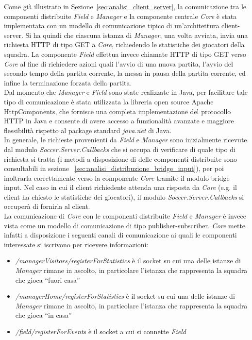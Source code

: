 Come già illustrato in Sezione~\ref{sec:analisi_client_server}, la comunicazione tra le componenti distribuite \emph{Field} e \emph{Manager} e la componente centrale \emph{Core} è stata implementata con un modello di comunicazione tipico di un’architettura client-server. Si ha quindi che ciascuna istanza di \emph{Manager}, una volta avviata, invia una richiesta HTTP di tipo GET a \emph{Core}, richiedendo le statistiche dei giocatori della squadra. La componente \emph{Field} effettua invece chiamate HTTP di tipo GET verso \emph{Core} al fine di richiedere azioni quali l'avvio di una nuova partita, l'avvio del secondo tempo della partita corrente, la messa in pausa della partita corrente, ed infine la terminazione forzata della partita.\\

Dal momento che \textit{Manager} e \textit{Field} sono state realizzate in Java, per facilitare tale tipo di comunicazione è stata utilizzata la libreria open source Apache HttpComponents, che fornisce una completa implementazione del protocollo HTTP in Java e consente di avere accesso a funzionalità avanzate e maggiore flessibilità rispetto al package standard \emph{java.net} di Java.\\

In generale, le richieste provenienti da \emph{Field} e \emph{Manager} sono inizialmente ricevute dal modulo \emph{Soccer.Server.Callbacks} che si occupa di verificare di quale tipo di richiesta si tratta (i metodi a disposizione di delle componenti distribuite sono consultabili in sezione ~\ref{sec:analisi_distribuzione_bridge_input}), per poi inoltrarla correttamente verso la componente \emph{Core} tramite il modulo bridge input. Nel caso in cui il client richiedente attenda una risposta da \emph{Core} (e.g. il client ha chiesto le statistiche dei giocatori), il modulo \emph{Soccer.Server.Callbacks} si occuperà di fornirla al client.\\

La comunicazione di \emph{Core} con le componenti distribuite \emph{Field} e \emph{Manager} è invece vista come un modello di comunicazione di tipo publisher-subscriber. \emph{Core} mette infatti a disposizione i seguenti canali di comunicazione ai quali le componenti interessate si iscrivono per ricevere informazioni:

\begin{itemize}
	\item \emph{/managerVisitors/registerForStatistics} è il socket su cui una delle istanze di \emph{Manager} rimane in ascolto, in particolare l'istanza che rappresenta la squadra che gioca ``fuori casa''
	\item \emph{/managerHome/registerForStatistics} è il socket su cui una delle istanze di \emph{Manager} rimane in ascolto, in particolare l'istanza che rappresenta la squadra che gioca ``in casa''
	\item \emph{/field/registerForEvents} è il socket a cui si connette \emph{Field}
\end{itemize}

